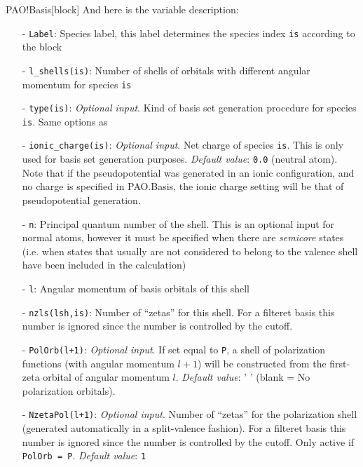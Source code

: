 \begin{fdfentry}{PAO!Basis}[block]
  \noindent
  And here is the variable description:
  \begin{itemize}
    \item[-] %
    \texttt{Label}: Species label, this label determines
    the species index \texttt{is} according to the block

    \item[-]%
    \texttt{l\_shells(is)}: Number of shells of orbitals
    with different angular momentum for species \texttt{is}

    \item[-]%
    \texttt{type(is)}: \textit{Optional input}.  Kind of basis set
    generation procedure for species \texttt{is}.  Same options as

    \item[-]%
    \texttt{ionic\_charge(is)}: \textit{Optional input}.  Net charge
    of species \texttt{is}. This is only used for basis set generation
    purposes. \textit{Default value}: \texttt{0.0} (neutral
    atom). Note that if the pseudopotential was generated in an ionic
    configuration, and no charge is specified in PAO.Basis, the ionic
    charge setting will be that of pseudopotential generation.

    \item[-]%
    \texttt{n}: Principal quantum number of the shell. This is an
    optional input for normal atoms, however it must be specified when
    there are \textit{semicore} states (i.e. when states that usually
    are not considered to belong to the valence shell have been
    included in the calculation)

    \item[-]%
    \texttt{l}: Angular momentum of basis orbitals of this shell

    \item[-]%
    \texttt{nzls(lsh,is)}: Number of ``zetas'' for this shell. For a
    filteret basis this number is ignored since the number is
    controlled by the cutoff.

    \item[-]%
    \texttt{PolOrb(l+1)}: \textit{Optional input}. If set equal to
    \texttt{P}, a shell of polarization functions (with angular
    momentum $l+1$) will be constructed from the first-zeta orbital of
    angular momentum $l$. \textit{Default value}: ' ' (blank = No
    polarization orbitals).

    \item[-]%
    \texttt{NzetaPol(l+1)}: \textit{Optional input}. Number of
    ``zetas'' for the polarization shell (generated automatically in a
    split-valence fashion).  For a filteret basis this number is
    ignored since the number is controlled by the cutoff.  Only active
    if \texttt{PolOrb = P}. \textit{Default value}: \texttt{1}


\end{itemize}
\end{fdfentry}
